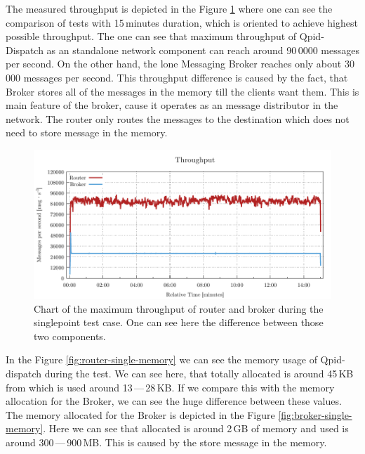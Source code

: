 The measured throughput is depicted in the Figure \ref{fig:rate-single} where one can see the comparison of tests with 15\,minutes duration, which is oriented to achieve highest possible throughput. The one can see that maximum throughput of Qpid-Dispatch as an standalone network component can reach around 90\,0000 messages per second. On the other hand, the lone Messaging Broker reaches only about 30\,000 messages per second. This throughput difference is caused by the fact, that Broker stores all of the messages in the memory till the clients want them. This is main feature of the broker, cause it operates as an message distributor in the network. The router only routes the messages to the destination which does not need to store message in the memory.

\begin{figure}[H]
	\centering
	\includegraphics[width=1\linewidth]{obrazky-figures/charts/singlepoint-throughput.pdf}
	\caption{Chart of the maximum throughput of router and broker during the singlepoint test case. One can see here the difference between those two components.}
	\label{fig:rate-single}
\end{figure}

In the Figure \ref{fig:router-single-memory} we can see the memory usage of Qpid-dispatch during the test. We can see here, that totally allocated is around 45\,KB from which is used around 13\,---\,28\,KB. If we compare this with the memory allocation for the Broker, we can see the huge difference between these values. The memory allocated for the Broker is depicted in the Figure \ref{fig:broker-single-memory}. Here we can see that allocated is around 2\,GB of memory and used is around 300\,---\,900\,MB. This is caused by the store message in the memory.

